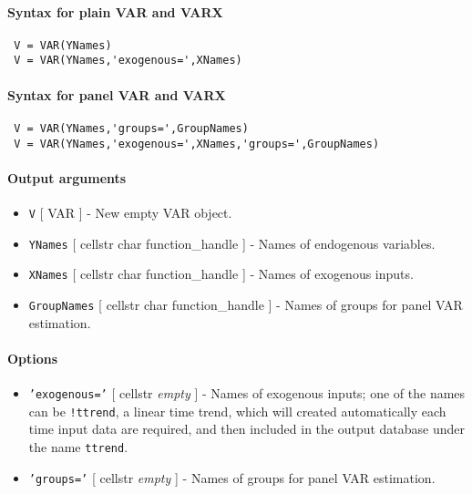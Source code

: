 


	\paragraph{Syntax for plain VAR and VARX}
 
 \begin{verbatim}
 V = VAR(YNames)
 V = VAR(YNames,'exogenous=',XNames)
 \end{verbatim}
 
 \paragraph{Syntax for panel VAR and VARX}
 
 \begin{verbatim}
 V = VAR(YNames,'groups=',GroupNames)
 V = VAR(YNames,'exogenous=',XNames,'groups=',GroupNames)
 \end{verbatim}
 
 \paragraph{Output arguments}
 
 \begin{itemize}
 \item
   \texttt{V} {[} VAR {]} - New empty VAR object.
 \item
   \texttt{YNames} {[} cellstr \textbar{} char \textbar{}
   function\_handle {]} - Names of endogenous variables.
 \item
   \texttt{XNames} {[} cellstr \textbar{} char \textbar{}
   function\_handle {]} - Names of exogenous inputs.
 \item
   \texttt{GroupNames} {[} cellstr \textbar{} char \textbar{}
   function\_handle {]} - Names of groups for panel VAR estimation.
 \end{itemize}
 
 \paragraph{Options}
 
 \begin{itemize}
 \item
   \texttt{'exogenous='} {[} cellstr \textbar{} \emph{empty} {]} - Names
   of exogenous inputs; one of the names can be \texttt{!ttrend}, a
   linear time trend, which will created automatically each time input
   data are required, and then included in the output database under the
   name \texttt{ttrend}.
 \item
   \texttt{'groups='} {[} cellstr \textbar{} \emph{empty} {]} - Names of
   groups for panel VAR estimation.
 \end{itemize}
 
